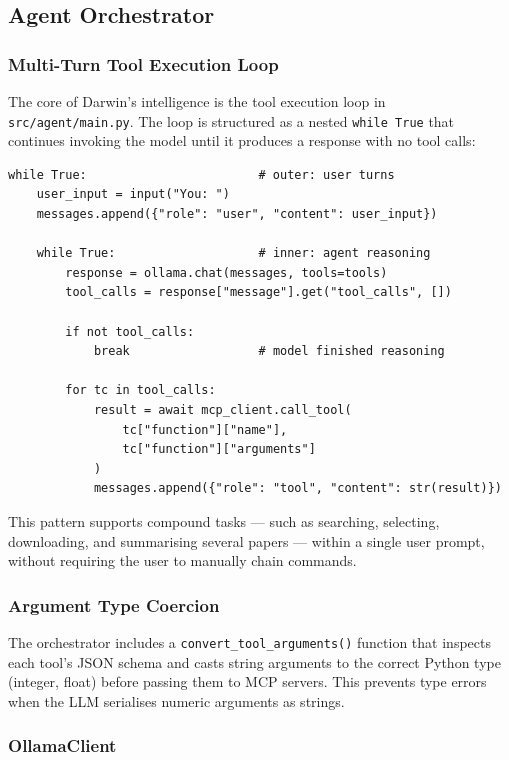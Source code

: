 \documentclass[12pt, a4paper]{article}
\newcommand{\code}[1]{\texttt{\small\color{darwinblue}#1}}
\begin{document}
\subsection{Agent Orchestrator}

\subsubsection{Multi-Turn Tool Execution Loop}

The core of Darwin's intelligence is the tool execution loop in \code{src/agent/main.py}. The loop is structured as a nested \code{while True} that continues invoking the model until it produces a response with no tool calls:

\begin{lstlisting}[style=pycode]
while True:                        # outer: user turns
    user_input = input("You: ")
    messages.append({"role": "user", "content": user_input})

    while True:                    # inner: agent reasoning
        response = ollama.chat(messages, tools=tools)
        tool_calls = response["message"].get("tool_calls", [])

        if not tool_calls:
            break                  # model finished reasoning

        for tc in tool_calls:
            result = await mcp_client.call_tool(
                tc["function"]["name"],
                tc["function"]["arguments"]
            )
            messages.append({"role": "tool", "content": str(result)})
\end{lstlisting}

This pattern supports compound tasks --- such as searching, selecting, downloading, and summarising several papers --- within a single user prompt, without requiring the user to manually chain commands.

\subsubsection{Argument Type Coercion}

The orchestrator includes a \code{convert\_tool\_arguments()} function that inspects each tool's JSON schema and casts string arguments to the correct Python type (integer, float) before passing them to MCP servers. This prevents type errors when the LLM serialises numeric arguments as strings.

\subsubsection{OllamaClient}
\end{document}
